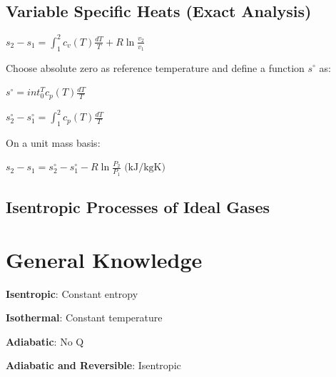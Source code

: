 \documentclass{article}
\begin{document}
\begin{multicols}{3}
    \subsection*{Variable Specific Heats (Exact Analysis)}
    $s_2-s_1=\int_1^2c_v(T)\frac{dT}{T}+R\ln{\frac{v_2}{v_1}}$\par 
    Choose absolute zero as reference temperature and define a function $s^\circ$ as:\par 
    $s^\circ=int_0^Tc_p(T)\frac{dT}{T}$\par 
    $s_2^\circ-s_1^\circ=\int_1^2c_p(T)\frac{dT}{T}$\par 
    On a unit mass basis: \par 
    $s_2-s_1=s_2^\circ-s_1^\circ-R\ln\frac{P_2}{P_1}\text{ (kJ/kgK)}$\par 
    \subsection*{Isentropic Processes of Ideal Gases}

    \section*{General Knowledge}
    \textbf{Isentropic}: Constant entropy\par 
    \textbf{Isothermal}: Constant temperature\par 
    \textbf{Adiabatic}: No Q\par 
    \textbf{Adiabatic and Reversible}: Isentropic\par


\end{multicols}  
\end{document}
